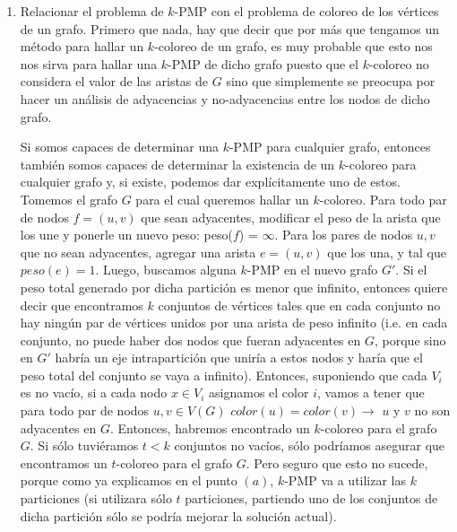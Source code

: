 \documentclass[11pt, a4paper, twoside]{article}
\begin{document}
\begin{enumerate}
\begin{enumerate}
\begin{enumerate}
			  \end{enumerate}
		
		\item Relacionar el problema de $k$-PMP con el problema de coloreo de los vértices
		      de un grafo.
		      Primero que nada, hay que decir que por más que tengamos un método para hallar
		      un $k$-coloreo de un grafo, es muy probable que esto nos nos sirva para hallar una
		      $k$-PMP de dicho grafo puesto que el $k$-coloreo no considera el valor de las 
		      aristas de $G$ sino que simplemente se preocupa por hacer un análisis de 
		      adyacencias y no-adyacencias entre los nodos de dicho grafo.
		      
		      Si somos capaces de determinar una $k$-PMP para cualquier grafo, entonces también
		      somos capaces de determinar la existencia de un $k$-coloreo para cualquier
		      grafo y, si existe, podemos dar explícitamente uno de estos. \\
		      Tomemos el grafo $G$ para el cual queremos hallar un 
		      $k$-coloreo. Para todo par de nodos $f=(u,v)$ que sean adyacentes, modificar el peso
		      de la arista que los une y ponerle un nuevo peso: peso($f$) = $\infty$.
		      Para los pares de nodos $u,v$ que no sean adyacentes, agregar
		      una arista $e=(u,v)$ que los una, y tal que $peso(e) = 1$. Luego, buscamos
		      alguna $k$-PMP en el nuevo grafo $G'$. Si el peso total generado por dicha 
		      partición es menor que infinito, entonces quiere decir que encontramos $k$ 
		      conjuntos de vértices tales que en cada conjunto no hay ningún par de vértices 
		      unidos por una arista de peso infinito (i.e. en cada conjunto, no puede haber
		      dos nodos que fueran adyacentes en $G$, porque sino en $G'$ habría un eje
		      intrapartición que uniría a estos nodos y haría que el peso total del conjunto
		      se vaya a infinito).
		      Entonces, suponiendo que cada $V_{i}$ es no vacío,  
		      si a cada nodo $x \in V_{i}$ asignamos el color $i$, vamos a tener que
		      para todo par de nodos $u,v \in V(G)$ $color(u)=color(v) \rightarrow $ $u$ y $v$ 
		      no son adyacentes en $G$. Entonces, habremos encontrado un $k$-coloreo para el
		      grafo $G$. Si sólo tuviéramos $t < k$ conjuntos no vacíos, sólo 
		      podríamos asegurar que encontramos un $t$-coloreo para el grafo $G$. Pero seguro que
		      esto no sucede, porque como ya explicamos en el punto $(a)$, $k$-PMP va a utilizar las
		      $k$ particiones (si utilizara sólo $t$ particiones, partiendo uno de los conjuntos de 
		      dicha partición sólo se podría mejorar la solución actual). \\
 

\end{enumerate}
\end{enumerate}
\end{document}
